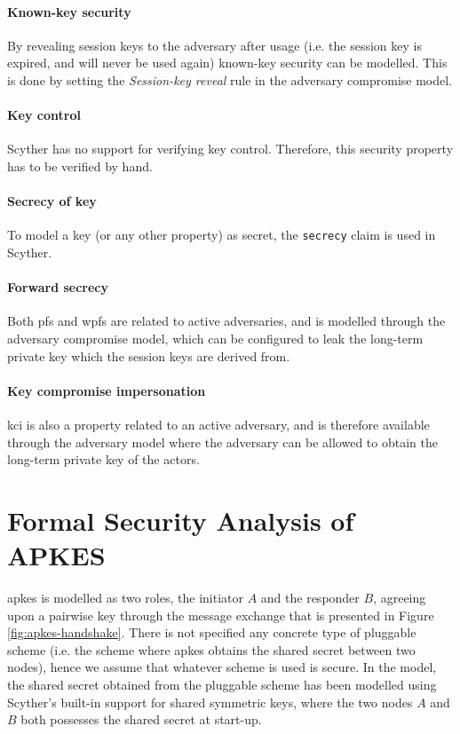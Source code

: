 \paragraph{Known-key security} By revealing session keys to the adversary after usage (i.e. the session key is expired, and will never be used again) known-key security can be modelled. This is done by setting the \emph{Session-key reveal} rule in the adversary compromise model.

\paragraph{Key control} Scyther has no support for verifying key control. Therefore, this security property has to be verified by hand. 

\paragraph{Secrecy of key} To model a key (or any other property) as secret, the \texttt{secrecy} claim is used in Scyther.

\paragraph{Forward secrecy} Both \gls{pfs} and \gls{wpfs} are related to active adversaries, and is modelled through the adversary compromise model, which can be configured to leak the long-term private key which the session keys are derived from.

\paragraph{Key compromise impersonation} \gls{kci} is also a property related to an active adversary, and is therefore available through the adversary model where the adversary can be allowed to obtain the long-term private key of the actors.


\section{Formal Security Analysis of APKES}
\label{sec:apkes-analysis}

\gls{apkes} is modelled as two roles, the initiator $A$ and the responder $B$, agreeing upon a pairwise key through the message exchange that is presented in Figure \ref{fig:apkes-handshake}. There is not specified any concrete type of pluggable scheme (i.e. the scheme where \gls{apkes} obtains the shared secret between two nodes), hence we assume that whatever scheme is used is secure. In the model, the shared secret obtained from the pluggable scheme has been modelled using Scyther's built-in support for shared symmetric keys, where the two nodes $A$ and $B$ both possesses the shared secret at start-up.

